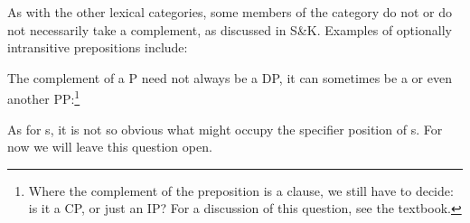 \documentclass{article}
\begin{document}
As with the other lexical categories, some members of the category do not or do not necessarily take a complement, as discussed in S\&K.
Examples of optionally intransitive prepositions include:
\begin{exe}
\end{exe}
\newpage
\begin{exe}
\end{exe}

The complement of a P need not always be a DP, it can sometimes be a  or even another PP:\footnote{Where the complement of the preposition is a clause, we still have to decide: is it a CP, or just an IP?  For a discussion of this question, see the textbook.}
\begin{exe}
\end{exe}
As for s, it is not so obvious what might occupy the specifier position of s.
For now we will leave this question open.
\end{document}
